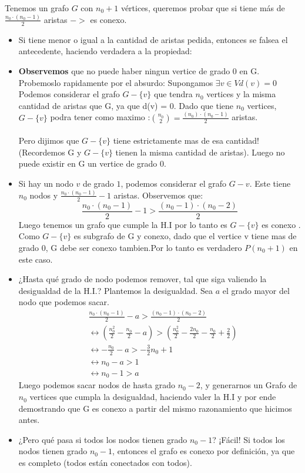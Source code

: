 \documentclass{article}
\begin{document}
Tenemos un grafo $G$ con $n_0 + 1$ vértices, queremos probar que si tiene más de $\frac{n_0 \cdot (n_0-1)}{2}$ aristas $->$ es conexo.
\begin{itemize}

	\item Si tiene menor o igual a la cantidad de aristas pedida, entonces se falsea el antecedente, haciendo verdadera a la propiedad:
	
	\item \textbf{Observemos} que no puede haber ningun vertice de grado 0 en G. Probemoslo rapidamente por el absurdo: Supongamos $\exists v \in V d(v) = 0$ \\ 
	Podemos considerar el grafo $G-\{v\}$ que tendra $n_0$ vertices y la misma cantidad de aristas que G, ya que d(v) = 0. Dado que tiene $n_0$ vertices, $G-\{v\}$ podra tener como maximo :$ \binom{n_0}{2} = \frac{(n_0) \cdot (n_0-1)}{2}$ aristas.\\ \\
	Pero dijimos que $G-\{v\}$ tiene  estrictamente mas de esa cantidad!(Recordemos G  y $G-\{v\}$ tienen la misma cantidad de aristas). Luego no puede existir en G un vertice de grado 0.
		  
    \item Si hay un nodo $v$ de  grado $1$, podemos considerar el grafo $G-v$. Este tiene $n_0$ nodos y $\frac{n_0 \cdot (n_0 -1)}{2}  - 1$ aristas. Observemos que: 
    $$\frac{n_0 \cdot (n_0 -1)}{2}  - 1 > \frac{(n_0-1) \cdot (n_0-2)}{2}$$ 
    Luego tenemos un grafo que cumple la H.I por lo tanto es $G-\{v\}$ es conexo . Como $G-\{v\}$ es subgrafo de G y conexo,  dado que el vertice v tiene mas de grado 0, G debe ser conexo tambien.Por lo tanto es verdadero $P(n_0 + 1)$ en este caso.
    
    \item ¿Hasta qué grado de nodo podemos remover, tal que siga valiendo la desigualdad de la H.I.? Plantemos la desigualdad. Sea $a$ el grado mayor del nodo que podemos sacar.
    \begin{align*}
        &\frac{n_0 \cdot (n_0 -1)}{2}  - a > \frac{(n_0-1) \cdot (n_0-2)}{2} \\
        &\leftrightarrow \left(\frac{n_0^2}{2} -\frac{n_0}{2} - a\right) > \left(\frac{n_0^2}{2} - \frac{2n_0}{2} - \frac{n_0}{2} + \frac{2}{2}\right) \\
        &\leftrightarrow -\frac{n_0}{2}  -a > - \frac{3}{2}n_0 + 1 \\
        &\leftrightarrow n_0 - a > 1 \\
        &\leftrightarrow n_0 - 1 > a
    \end{align*}
   Luego podemos sacar nodos de hasta grado $n_0 - 2$, y generarnos un Grafo de $n_0$ vertices que  cumpla la desigualdad, haciendo valer la H.I y por ende demostrando que G es conexo a partir del mismo razonamiento que hicimos antes.
   \item ¿Pero qué pasa si todos los nodos tienen grado $n_0-1$? 
   ¡Fácil! Si todos los nodos tienen grado $n_0 -1$, entonces el grafo es conexo por definición, ya que es completo (todos están conectados con todos).
\end{itemize}    
\end{document}
